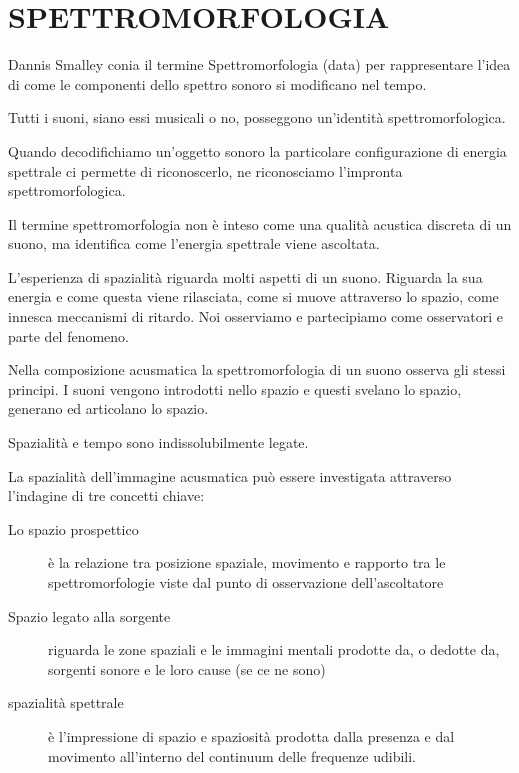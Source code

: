 
\chapter{SPETTROMORFOLOGIA}


Dannis Smalley conia il termine Spettromorfologia (data) per rappresentare l'idea di come le
componenti dello spettro sonoro si modificano nel tempo.

Tutti i suoni, siano essi musicali o no, posseggono un'identità spettromorfologica.

Quando decodifichiamo un'oggetto sonoro la particolare configurazione di energia spettrale
ci permette di riconoscerlo, ne riconosciamo l'impronta spettromorfologica.

Il termine spettromorfologia non è inteso come una qualità acustica discreta di un suono,
ma identifica come l'energia spettrale viene ascoltata.

L'esperienza di spazialità riguarda molti aspetti di un suono. Riguarda la sua energia e come questa viene rilasciata, come si muove attraverso lo spazio, come innesca meccanismi di ritardo. Noi osserviamo e partecipiamo come osservatori e parte del fenomeno.

Nella composizione acusmatica la spettromorfologia di un suono osserva gli stessi principi. I suoni vengono introdotti nello spazio e questi svelano lo spazio, generano ed articolano lo spazio.

Spazialità e tempo sono indissolubilmente legate.

La spazialità dell'immagine acusmatica può essere investigata attraverso l'indagine di tre concetti chiave:

\begin{description}
  \item[Lo spazio prospettico] è la relazione tra posizione spaziale, movimento e rapporto tra le spettromorfologie viste dal punto di osservazione dell'ascoltatore
  \item[Spazio legato alla sorgente] riguarda le zone spaziali e le immagini mentali prodotte da, o dedotte da, sorgenti sonore e le loro cause (se ce ne sono)
  \item[spazialità spettrale]è l'impressione di spazio e spaziosità prodotta dalla presenza e dal movimento all'interno del continuum delle frequenze udibili.
  \end{description}


